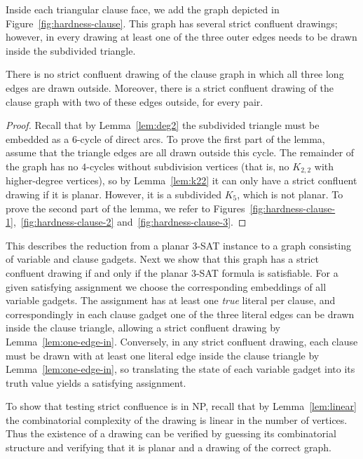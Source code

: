 \documentclass{llncs}
\begin{document}
Inside each triangular clause face, we add the graph depicted in Figure~\ref {fig:hardness-clause}. This graph has several strict confluent drawings; however, in every drawing at least one of the three outer edges needs to be drawn inside the subdivided triangle.





\begin {lemma}\label{lem:one-edge-in}
  There is no strict confluent drawing of the clause graph in which all three long edges are drawn outside. Moreover, there is a strict confluent drawing of the clause graph with two of these edges outside, for every pair.
\end {lemma}

\begin {proof}
  Recall that by Lemma~\ref {lem:deg2} the subdivided triangle must be embedded as a $6$-cycle of direct arcs.
To prove the first part of the lemma, assume that the triangle edges are all drawn outside this cycle.
  The remainder of the graph has no $4$-cycles without subdivision vertices (that is, no $K_{2,2}$ with higher-degree vertices), so by Lemma~\ref {lem:k22} it can only have a strict confluent drawing if it is planar. However, it is a subdivided $K_5$, which is not planar.  To prove the second part of the lemma, we refer to Figures~\ref {fig:hardness-clause-1},~\ref {fig:hardness-clause-2} and~\ref {fig:hardness-clause-3}.
\end {proof}



This describes the reduction from a planar 3-SAT instance to a graph consisting of variable and clause gadgets. Next we show that this graph has a strict confluent drawing if and only if the planar 3-SAT formula is satisfiable. For a given satisfying assignment we choose the corresponding embeddings of all variable gadgets. The assignment has at least one \emph{true} literal per clause, and correspondingly in each clause gadget one of the three literal edges can be drawn inside the clause triangle, allowing a strict confluent drawing by Lemma~\ref{lem:one-edge-in}. Conversely, in any strict confluent drawing, each clause must be drawn with at least one literal edge inside the clause triangle by Lemma~\ref{lem:one-edge-in}, so translating the state of each variable gadget into its truth value yields a satisfying assignment.

To show that testing strict confluence is in NP, recall that by Lemma~\ref{lem:linear} the combinatorial complexity of the drawing is linear in the number of vertices. Thus the existence of a drawing can be verified by guessing its combinatorial structure and verifying that it is planar and a drawing of the correct graph.
\end{document}
